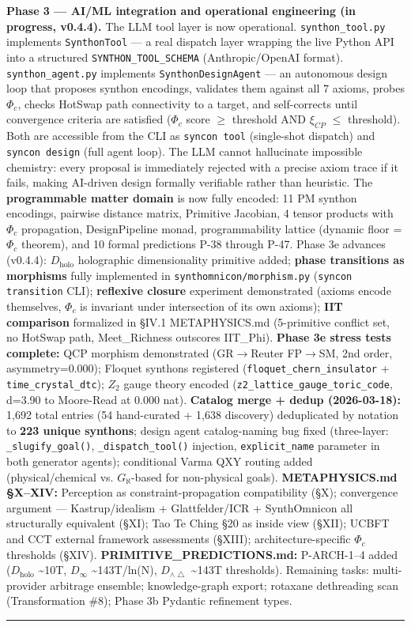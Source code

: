 \documentclass[12pt,a4paper]{article}
\begin{document}
\textbf{Phase 3 --- AI/ML integration and operational engineering (in progress, v0.4.4).} The LLM tool layer is now operational. \texttt{synthon\_tool.py} implements \texttt{SynthonTool} --- a real dispatch layer wrapping the live Python API into a structured \texttt{SYNTHON\_TOOL\_SCHEMA} (Anthropic/OpenAI format). \texttt{synthon\_agent.py} implements \texttt{SynthonDesignAgent} --- an autonomous design loop that proposes synthon encodings, validates them against all 7 axioms, probes $\Phi_c$, checks HotSwap path connectivity to a target, and self-corrects until convergence criteria are satisfied ($\Phi_c$ score $\geq$ threshold AND $\xi_{CP}$ $\leq$ threshold). Both are accessible from the CLI as \texttt{syncon tool} (single-shot dispatch) and \texttt{syncon design} (full agent loop). The LLM cannot hallucinate impossible chemistry: every proposal is immediately rejected with a precise axiom trace if it fails, making AI-driven design formally verifiable rather than heuristic. The \textbf{programmable matter domain} is now fully encoded: 11 PM synthon encodings, pairwise distance matrix, Primitive Jacobian, 4 tensor products with $\Phi_c$ propagation, DesignPipeline monad, programmability lattice (dynamic floor = $\Phi_c$ theorem), and 10 formal predictions P-38 through P-47. Phase 3e advances (v0.4.4): \textbf{$D_{\text{holo}}$} holographic dimensionality primitive added; \textbf{phase transitions as morphisms} fully implemented in \texttt{synthomnicon/morphism.py} (\texttt{syncon transition} CLI); \textbf{reflexive closure} experiment demonstrated (axioms encode themselves, $\Phi_c$ is invariant under intersection of its own axioms); \textbf{IIT comparison} formalized in §IV.1 METAPHYSICS.md (5-primitive conflict set, no HotSwap path, Meet\_Richness outscores IIT\_Phi). \textbf{Phase 3e stress tests complete:} QCP morphism demonstrated (GR$\rightarrow$Reuter FP$\rightarrow$SM, 2nd order, asymmetry=0.000); Floquet synthons registered (\texttt{floquet\_chern\_insulator} + \texttt{time\_crystal\_dtc}); $Z_2$ gauge theory encoded (\texttt{z2\_lattice\_gauge\_toric\_code}, d=3.90 to Moore-Read at 0.000 nat). \textbf{Catalog merge + dedup (2026-03-18):} 1,692 total entries (54 hand-curated + 1,638 discovery) deduplicated by notation to \textbf{223 unique synthons}; design agent catalog-naming bug fixed (three-layer: \texttt{\_slugify\_goal()}, \texttt{\_dispatch\_tool()} injection, \texttt{explicit\_name} parameter in both generator agents); conditional Varma QXY routing added (physical/chemical vs. $G_{\aleph}$-based for non-physical goals). \textbf{METAPHYSICS.md §X--XIV:} Perception as constraint-propagation compatibility (§X); convergence argument --- Kastrup/idealism + Glattfelder/ICR + SynthOmnicon all structurally equivalent (§XI); Tao Te Ching §20 as inside view (§XII); UCBFT and CCT external framework assessments (§XIII); architecture-specific $\Phi_c$ thresholds (§XIV). \textbf{PRIMITIVE\_PREDICTIONS.md:} P-ARCH-1--4 added ($D_{\text{holo}}$ \textasciitilde{}10T, $D_{\infty}$ \textasciitilde{}143T/ln(N), $D_{\wedge\bigtriangleup}$ \textasciitilde{}143T thresholds). Remaining tasks: multi-provider arbitrage ensemble; knowledge-graph export; rotaxane dethreading scan (Transformation \#8); Phase 3b Pydantic refinement types.

\begin{center}
\rule{0.5\textwidth}{0.4pt}
\end{center}
\end{document}
